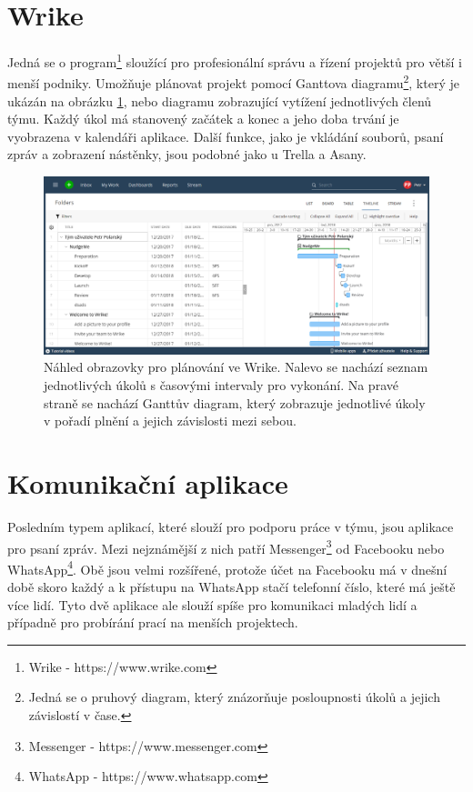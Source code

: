 \section{Wrike}

Jedná se o program\footnote{Wrike - https://www.wrike.com} sloužící pro profesionální správu a řízení projektů pro větší i menší podniky. Umožňuje plánovat projekt pomocí Ganttova diagramu\footnote{Jedná se o pruhový diagram, který znázorňuje posloupnosti úkolů a jejich závislostí v čase.}, který je ukázán na obrázku \ref{wrike}, nebo diagramu zobrazující vytížení jednotlivých členů týmu. Každý úkol má stanovený začátek a konec a jeho doba trvání je vyobrazena v kalendáři aplikace. Další funkce, jako je vkládání souborů, psaní zpráv a zobrazení nástěnky, jsou podobné jako u Trella a Asany. 

\begin{figure}[H]
\centering
\includegraphics[width= 15cm]{obrazky-figures/Wrike_Gantt}
\caption{Náhled obrazovky pro plánování ve Wrike. Nalevo se nachází seznam jednotlivých úkolů s časovými intervaly pro vykonání. Na pravé straně se nachází Ganttův diagram, který zobrazuje jednotlivé úkoly v pořadí plnění  a jejich závislosti mezi sebou. }
\label{wrike}
\end{figure}

\section{Komunikační aplikace}

Posledním typem aplikací, které slouží pro podporu práce v týmu, jsou aplikace pro psaní zpráv. Mezi nejznámější z nich patří Messenger\footnote{Messenger - https://www.messenger.com} od Facebooku nebo WhatsApp\footnote{WhatsApp - https://www.whatsapp.com}. Obě jsou velmi rozšířené, protože účet na Facebooku má v dnešní době skoro každý a k přístupu na WhatsApp stačí telefonní číslo, které má ještě více lidí. Tyto dvě aplikace ale slouží spíše pro komunikaci mladých lidí a případně pro probírání prací na menších projektech. 

